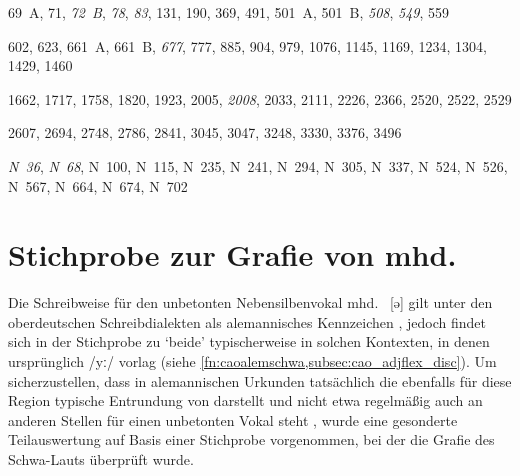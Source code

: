 {%
\setlength{\columnsep}{35pt} %
\raggedright
\begin{multicols}{2}
\begin{description}[font=\normalfont,labelsep=\fontdimen2\font]
\item[\cite{cao1},] 69~A, 71, \emph{72~B}, \emph{78}, \emph{83}, 131, 190, 369,
491, 501~A, 501~B, \emph{508}, \emph{549}, 559

\item[\cite{cao2},] 602, 623, 661~A, 661~B, \emph{677}, 777, 885, 904, 979,
1076, 1145, 1169, 1234, 1304, 1429, 1460

\item[\cite{cao3},] 1662, 1717, 1758, 1820, 1923, 2005, \emph{2008}, 2033, 2111,
2226, 2366, 2520, 2522, 2529

\item[\cite{cao4}] 2607, 2694, 2748, 2786, 2841, 3045, 3047, 3248, 3330, 3376,
3496

\item[\cite{cao5},] \emph{N~36}, \emph{N~68}, N~100, N~115, N~235, N~241, N~294,
N~305, N~337, N~524, N~526, N~567, N~664, N~674, N~702
\end{description}
\end{multicols}
}

\chapter{Stichprobe zur Grafie von mhd.\ }
\label{sec:caoalemschwa}

Die Schreibweise  für den unbetonten Nebensilbenvokal mhd.~ [ə]
gilt unter den ober\-deutschen Schreibdialekten als alemannisches Kennzeichen
\autocites[vgl.][25]{weinhold1863}[75]{weinhold1883}[41, 113]{paul2007}, jedoch
findet sich  in der Stichprobe zu  `beide' typischerweise
in solchen Kontexten, in denen ursprünglich  /yː/ vorlag (siehe
\cref{fn:caoalemschwa,subsec:cao_adjflex_disc}). Um sicherzustellen, dass
 in alemannischen Urkunden tatsächlich die ebenfalls für diese Region
typische Entrundung von  darstellt und nicht etwa regelmäßig auch an
anderen Stellen für einen unbetonten Vokal steht
\autocites%
	[466--467]{schirmunski1962}%
	[41]{paul2007}%
	[305]{ksw2}%
	[vgl.~auch][131--132]{boesch1946}%
, wurde eine gesonderte Teilauswertung auf Basis einer Stichprobe vorgenommen,
bei der die Grafie des Schwa-Lauts überprüft wurde.

